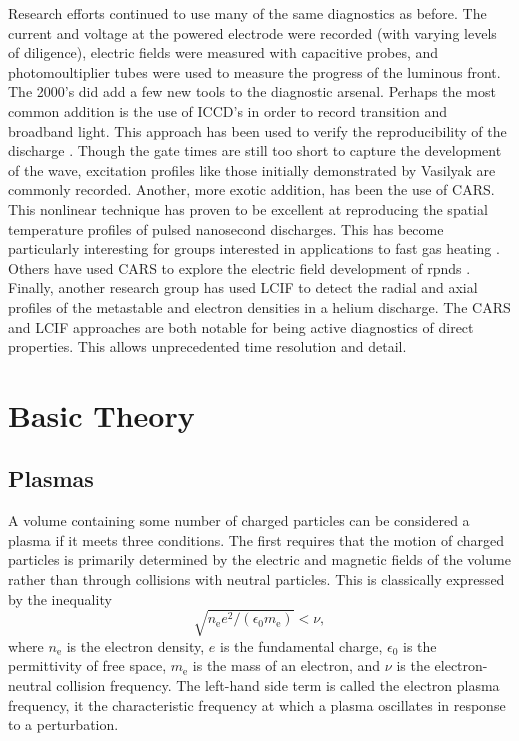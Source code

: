 Research efforts continued to use many of the same diagnostics as
before. The current and voltage at the powered electrode were recorded
(with varying levels of diligence), electric fields were measured with
capacitive probes, and photomoultiplier tubes were used to measure the
progress of the luminous front. The 2000's did add a few new tools to
the diagnostic arsenal. Perhaps the most common addition is the use of
ICCD's in order to record transition and broadband light. This approach
has been used to verify the reproducibility of the discharge
\cite{Adamovich2009}. Though the gate times are still too short to
capture the development of the wave, excitation profiles like those
initially demonstrated by Vasilyak\cite{Vasilyak1994} are commonly
recorded. Another, more exotic addition, has been the use of CARS. This
nonlinear technique has proven to be excellent at reproducing the
spatial temperature profiles of pulsed nanosecond discharges. This has
become particularly interesting for groups interested in applications to
fast gas heating \cite{Zuzeek2010}. Others have used CARS to explore the
electric field development of rpnds \cite{Ito2011, Mueller2010}.
Finally, another research group has used LCIF to detect the radial and
axial profiles of the metastable and electron densities in a helium
discharge. The CARS and LCIF approaches are both notable for being
active diagnostics of direct properties. This allows unprecedented time
resolution and detail.



\section{Basic Theory}

\subsection{Plasmas}

A volume containing some number of charged particles can be considered a plasma
if it meets three conditions. The first requires that the motion of charged
particles is primarily determined by the electric and magnetic fields of the
volume rather than through collisions with neutral particles. This is
classically expressed by the inequality
\begin{equation}
  \sqrt{n_\mathrm{e} e^2 / (\epsilon_0 m_\mathrm{e})} < \nu,
\end{equation}
where $n_\mathrm{e}$ is the electron density, $e$ is the fundamental charge,
$\epsilon_0$ is the permittivity of free space, $m_\mathrm{e}$ is the mass of an
electron, and $\nu$ is the electron-neutral collision frequency. The left-hand
side term is called the electron plasma frequency, it the characteristic
frequency at which a plasma oscillates in response to a perturbation.

